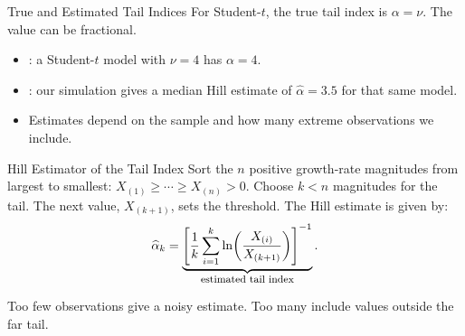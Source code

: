 \documentclass[aspectratio=169,11pt]{beamer}
\begin{document}
\begin{frame}{True and Estimated Tail Indices}
  For Student-$t$, the true tail index is $\alpha=\nu$.
  The value can be fractional.

  \vspace{0.9em}
  \begin{itemize}\setlength{\itemsep}{0.8em}
    \item {}: a Student-$t$ model with $\nu=4$ has
      $\alpha=4$.
    \item {}: our simulation gives a median Hill
      estimate of $\widehat\alpha=3.5$ for that same model.
    \item Estimates depend on the sample and how many extreme observations
      we include.
  \end{itemize}

\end{frame}

\begin{frame}{Hill Estimator of the Tail Index}
  Sort the $n$ positive growth-rate magnitudes from largest to smallest:
  $X_{(1)}\geq\cdots\geq X_{(n)}>0$.
  Choose $k<n$ magnitudes for the tail. The next value, $X_{(k+1)}$,
  sets the threshold. The Hill estimate is given by:
  \[
    \widehat\alpha_k=
    \underbrace{\left[\frac{1}{k}\sum_{i=1}^{k}
      \ln\!\left(\frac{X_{(i)}}{X_{(k+1)}}\right)\right]^{-1}}_{\text{\footnotesize estimated tail index}}.
  \]

  Too few observations give a noisy estimate. Too many include values
  outside the far tail.

\end{frame}
\end{document}
